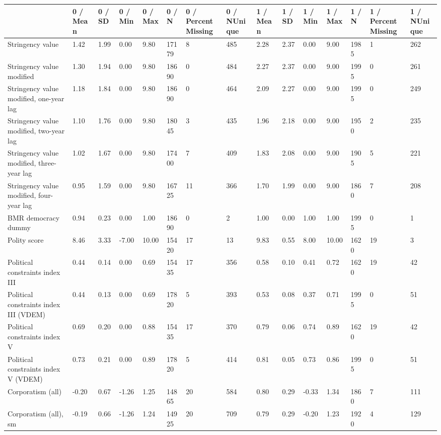 
\begin{longtable}{lllllllllllllll}
\toprule
  & 0 / Mean & 0 / SD & 0 / Min & 0 / Max & 0 / N & 0 / PercentMissing & 0 / NUnique & 1 / Mean & 1 / SD & 1 / Min & 1 / Max & 1 / N & 1 / PercentMissing & 1 / NUnique\\
\midrule
Stringency value & 1.42 & 1.99 & 0.00 & 9.80 & 17179 & 8 & 485 & 2.28 & 2.37 & 0.00 & 9.00 & 1985 & 1 & 262\\
Stringency value modified & 1.30 & 1.94 & 0.00 & 9.80 & 18690 & 0 & 484 & 2.27 & 2.37 & 0.00 & 9.00 & 1995 & 0 & 261\\
Stringency value modified, one-year lag & 1.18 & 1.84 & 0.00 & 9.80 & 18690 & 0 & 464 & 2.09 & 2.27 & 0.00 & 9.00 & 1995 & 0 & 249\\
Stringency value modified, two-year lag & 1.10 & 1.76 & 0.00 & 9.80 & 18045 & 3 & 435 & 1.96 & 2.18 & 0.00 & 9.00 & 1950 & 2 & 235\\
Stringency value modified, three-year lag & 1.02 & 1.67 & 0.00 & 9.80 & 17400 & 7 & 409 & 1.83 & 2.08 & 0.00 & 9.00 & 1905 & 5 & 221\\
\addlinespace
Stringency value modified, four-year lag & 0.95 & 1.59 & 0.00 & 9.80 & 16725 & 11 & 366 & 1.70 & 1.99 & 0.00 & 9.00 & 1860 & 7 & 208\\
BMR democracy dummy & 0.94 & 0.23 & 0.00 & 1.00 & 18690 & 0 & 2 & 1.00 & 0.00 & 1.00 & 1.00 & 1995 & 0 & 1\\
Polity score & 8.46 & 3.33 & -7.00 & 10.00 & 15420 & 17 & 13 & 9.83 & 0.55 & 8.00 & 10.00 & 1620 & 19 & 3\\
Political constraints index III & 0.44 & 0.14 & 0.00 & 0.69 & 15435 & 17 & 356 & 0.58 & 0.10 & 0.41 & 0.72 & 1620 & 19 & 42\\
Political constraints index III (VDEM) & 0.44 & 0.13 & 0.00 & 0.69 & 17820 & 5 & 393 & 0.53 & 0.08 & 0.37 & 0.71 & 1995 & 0 & 51\\
\addlinespace
Political constraints index V & 0.69 & 0.20 & 0.00 & 0.88 & 15435 & 17 & 370 & 0.79 & 0.06 & 0.74 & 0.89 & 1620 & 19 & 42\\
Political constraints index V (VDEM) & 0.73 & 0.21 & 0.00 & 0.89 & 17820 & 5 & 414 & 0.81 & 0.05 & 0.73 & 0.86 & 1995 & 0 & 51\\
Corporatism (all) & -0.20 & 0.67 & -1.26 & 1.25 & 14865 & 20 & 584 & 0.80 & 0.29 & -0.33 & 1.34 & 1860 & 7 & 111\\
Corporatism (all), sm & -0.19 & 0.66 & -1.26 & 1.24 & 14925 & 20 & 709 & 0.79 & 0.29 & -0.20 & 1.23 & 1920 & 4 & 129\\

\end{longtable}

